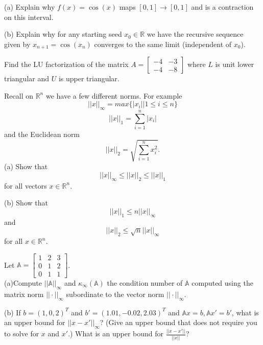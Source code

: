\documentclass[12pt]{article}
\begin{document}
\newpage
{} 
(a) Explain why $f(x)=\cos(x)$ maps $[0,1] \to [0,1]$ and is a contraction on this interval. 

\vspace{3 in}

\noindent
(b) Explain why for any starting seed $x_0 \in \mathbb{R}$ we have the recursive sequence given by $x_{n+1}=\cos(x_n)$ converges to the 
same limit (independent of $x_0$).

\anotherpart

\noindent
Find the LU factorization of the matrix $A=\begin{bmatrix}   -4 & - 3 \\ -4 & - 8 \end{bmatrix}$ where $L$ is unit lower triangular and $U$ is upper triangular.

\vspace{3in}

Recall on $\mathbb{R}^n$ we have a few different norms. For example
$$
||x||_{\infty}=max\{ |x_i| | 1 \leq i \leq n \}
$$
$$
||x||_{1}=\sum_{i=1}^n |x_i| 
$$
and the Euclidean norm 
$$
||x||_{2}=\sqrt{\sum_{i=1}^n x_i^2}.
$$
(a) Show that $$||x||_{\infty} \leq ||x||_2 \leq ||x||_1$$ for all vectors $x \in \mathbb{R}^n$. \\

\vspace{2in}

\noindent
(b) Show that $$||x||_1 \leq n ||x||_{\infty}$$ and $$||x||_2 \leq \sqrt{n} ||x||_{\infty}$$ for all $x \in \mathbb{R}^n$. \\

\vspace{2in}

Let $\mathbb{A} = \begin{bmatrix} 1 & 2 & 3 \\ 0 & 1 & 2 \\ 0 & 1 & 1 \end{bmatrix}$. \\
(a)Compute $||\mathbb{A}||_{\infty}$ and $\kappa_{\infty}(\mathbb{A})$ the condition number of $\mathbb{A}$ computed 
using the matrix norm $||\cdot ||_{\infty}$ subordinate to the vector norm $|| \cdot ||_{\infty}$. \\

\vspace{2in}

\noindent
(b) If $b=(1,0,2)^T$ and $b'=(1.01,-0.02, 2.03)^T$ and $\mathbb{A}x=b, \mathbb{A}x'=b'$, 
what is an upper bound for $||x-x'||_{\infty}$? (Give an upper bound that does not require you to solve for $x$ and $x'$.) What is an upper bound for $\frac{||x-x'||}{||x||}$?
\end{document}

